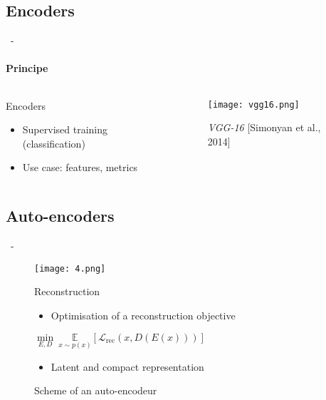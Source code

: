 \documentclass[aspectratio=169, 22pt]{beamer}
\begin{document}
\subsection{Encoders}
\begin{frame}{\secname~- \subsecname}
  \framesubtitle{Principe}
  \begin{columns}
    \begin{column}{0.4\linewidth}
      \begin{block}{Encoders}
        \begin{itemize}
        \item Supervised training (classification)
        \item Use case: features, metrics
        \end{itemize}
      \end{block}
    \end{column}
    \begin{column}{0.6\linewidth}
      \begin{figure}
        \centering
        \texttt{[image: vgg16.png]}
        \caption{\emph{VGG-16} [Simonyan et al., 2014]}
      \end{figure}
    \end{column}
  \end{columns}
\end{frame}

\subsection{Auto-encoders}
\begin{frame}{\secname~- \subsecname}
  \begin{figure}
    \centering
    \texttt{[image: 4.png]}
    \caption{Scheme of an auto-encodeur}
    \begin{block}{Reconstruction}
      \centering
      \begin{itemize}        
      \item Optimisation of a reconstruction objective
      \end{itemize}
      $\underset{E,D}{\min}\ \underset{x \sim p(x)}{\mathbb{E}}\left[\mathcal{L}_{\text{rec}}(x,D(E(x)))\right]$
      \begin{itemize}
      \item \alert{Latent} and compact representation
      \end{itemize}

    \end{block}
  \end{figure}
  
\end{frame}
\end{document}
